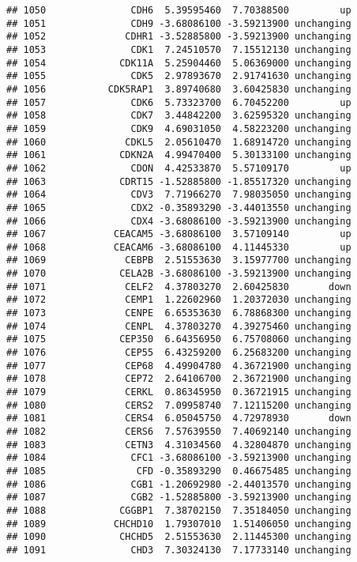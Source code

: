 \documentclass[]{article}
\begin{document}
\begin{verbatim}
## 1050               CDH6  5.39595460  7.70388500         up
## 1051               CDH9 -3.68086100 -3.59213900 unchanging
## 1052              CDHR1 -3.52885800 -3.59213900 unchanging
## 1053               CDK1  7.24510570  7.15512130 unchanging
## 1054             CDK11A  5.25904460  5.06369000 unchanging
## 1055               CDK5  2.97893670  2.91741630 unchanging
## 1056           CDK5RAP1  3.89740680  3.60425830 unchanging
## 1057               CDK6  5.73323700  6.70452200         up
## 1058               CDK7  3.44842200  3.62595320 unchanging
## 1059               CDK9  4.69031050  4.58223200 unchanging
## 1060              CDKL5  2.05610470  1.68914720 unchanging
## 1061             CDKN2A  4.99470400  5.30133100 unchanging
## 1062               CDON  4.42533870  5.57109170         up
## 1063             CDRT15 -1.52885800 -1.85517320 unchanging
## 1064               CDV3  7.71966270  7.98035050 unchanging
## 1065               CDX2 -0.35893290 -3.44013550 unchanging
## 1066               CDX4 -3.68086100 -3.59213900 unchanging
## 1067            CEACAM5 -3.68086100  3.57109140         up
## 1068            CEACAM6 -3.68086100  4.11445330         up
## 1069              CEBPB  2.51553630  3.15977700 unchanging
## 1070             CELA2B -3.68086100 -3.59213900 unchanging
## 1071              CELF2  4.37803270  2.60425830       down
## 1072              CEMP1  1.22602960  1.20372030 unchanging
## 1073              CENPE  6.65353630  6.78868300 unchanging
## 1074              CENPL  4.37803270  4.39275460 unchanging
## 1075             CEP350  6.64356950  6.75708060 unchanging
## 1076              CEP55  6.43259200  6.25683200 unchanging
## 1077              CEP68  4.49904780  4.36721900 unchanging
## 1078              CEP72  2.64106700  2.36721900 unchanging
## 1079              CERKL  0.86345950  0.36721915 unchanging
## 1080              CERS2  7.09958740  7.12115200 unchanging
## 1081              CERS4  6.05045750  4.72978930       down
## 1082              CERS6  7.57639550  7.40692140 unchanging
## 1083              CETN3  4.31034560  4.32804870 unchanging
## 1084               CFC1 -3.68086100 -3.59213900 unchanging
## 1085                CFD -0.35893290  0.46675485 unchanging
## 1086               CGB1 -1.20692980 -2.44013570 unchanging
## 1087               CGB2 -1.52885800 -3.59213900 unchanging
## 1088             CGGBP1  7.38702150  7.35184050 unchanging
## 1089            CHCHD10  1.79307010  1.51406050 unchanging
## 1090             CHCHD5  2.51553630  2.11445300 unchanging
## 1091               CHD3  7.30324130  7.17733140 unchanging

\end{verbatim}
\end{document}
